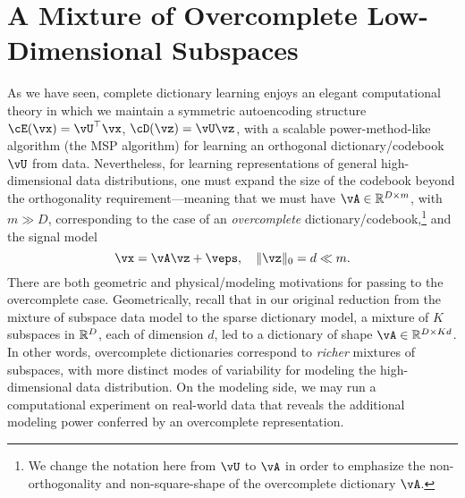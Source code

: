 \documentclass[../../book-main.tex]{subfiles}
\begin{document}
%

\section{A Mixture of Overcomplete Low-Dimensional Subspaces}
\label{sec:dictionary_learning}
As we have seen, complete dictionary learning enjoys an elegant computational theory in which we maintain a symmetric autoencoding structure $\cE(\vx) = \vU^\top \vx$, $\cD(\vz) = \vU \vz$, with a scalable power-method-like algorithm (the MSP algorithm) for learning an orthogonal dictionary/codebook $\vU$ from data. Nevertheless, for learning representations of general high-dimensional data distributions, one must expand the size of the codebook beyond the orthogonality requirement---meaning that we must have $\vA \in \R^{D \times m}$, with $m \gg D$, corresponding to the case of an \textit{overcomplete} dictionary/codebook,\footnote{We change the notation here from $\vU$ to $\vA$ in order to emphasize the non-orthogonality and non-square-shape of the overcomplete dictionary $\vA$.} and the signal model
\begin{equation}\label{eq:model-DL-overcomplete}
    \vx =  \vA \vz + \veps,
    \quad
    \norm{\vz}_0 = d \ll m.
\end{equation}
There are both geometric and physical/modeling motivations for passing to the overcomplete case. 
Geometrically, recall that in our original reduction from the mixture of subspace data model to the sparse dictionary model, a mixture of $K$ subspaces in $\mathbb{R}^D$, each of dimension $d$, led to a dictionary of shape $\vA \in \R^{D \times Kd}$.
In other words, overcomplete dictionaries correspond to \textit{richer} mixtures of subspaces, with more distinct modes of variability for modeling the high-dimensional data distribution.
On the modeling side, we may run a computational experiment on real-world data that reveals the additional modeling power conferred by an overcomplete representation.
\end{document}
